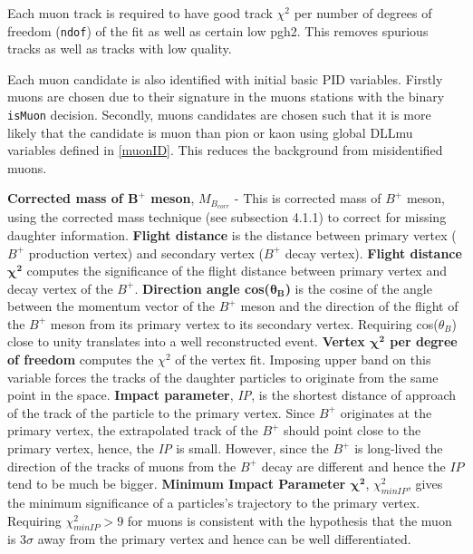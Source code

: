 Each muon track is required to have good track $\chi^{2}$ per number of degrees of freedom (\texttt{ndof}) of the fit as well as certain low \Gls{pgh2}. This removes spurious tracks as well as tracks with low quality.

Each muon candidate is also identified with initial basic \Gls{PID} variables. Firstly muons are chosen due to their signature in the muons stations with the binary \texttt{isMuon} decision. Secondly, muons candidates are chosen such that it is more likely that the candidate is muon than pion or kaon using global DLLmu variables defined in \autoref{muonID}. This reduces the background from misidentified muons. 

\textbf{Corrected mass of $\boldsymbol{B^{+}}$ meson}, $M_{B_{corr}}$ - This is corrected mass of $B^{+}$ meson, using the corrected mass technique (see subsection 4.1.1) to correct for missing daughter information.
\newline\textbf{Flight distance} is the distance between primary vertex ($B^{+}$ production vertex) and secondary vertex ($B^{+}$ decay vertex). 
\newline\textbf{Flight distance $\boldsymbol{\chi^{2}}$} computes the significance of the flight distance between primary vertex and decay vertex of the $B^{+}$.
\newline\textbf{Direction angle cos($\boldsymbol{\theta_{B}}$)} is the cosine of the angle between the momentum vector of the $B^{+}$ meson and the direction of the flight of the $B^{+}$ meson from its primary vertex to its secondary vertex. Requiring cos($\theta_{B}$) close to unity translates into a well reconstructed event.  
\newline\textbf{Vertex $\boldsymbol{\chi^{2}}$ per degree of freedom} computes the $\chi^{2}$ of the vertex fit. Imposing upper band on this variable forces the tracks of the daughter particles to originate from the same point in the space.
\newline\textbf{Impact parameter}, \textit{IP}, is the shortest distance of approach of the track of the particle to the primary vertex. Since $B^{+}$ originates at the primary vertex, the extrapolated track of the $B^{+}$ should point close to the primary vertex, hence, the \textit{IP} is small. However, since the $B^{+}$ is long-lived the direction of the tracks of muons from the $B^{+}$ decay are different and hence the $IP$ tend to be much be bigger.
\newline\textbf{ Minimum Impact Parameter $\boldsymbol{\chi^{2}}$}, $\chi^{2}_{minIP}$, gives the minimum significance of a particles's trajectory to the primary vertex. Requiring $\chi^{2}_{minIP}>9$ for muons is consistent with the hypothesis that the muon is $3\sigma$ away from the primary vertex and hence can be well differentiated.
